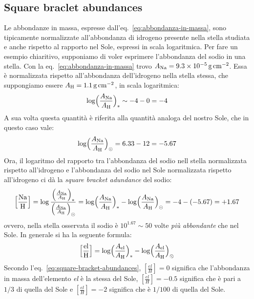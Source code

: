 \subsection{Square braclet abundances}
Le abbondanze in massa, espresse dall'eq.~\eqref{eq:abbondanza-in-massa}, sono tipicamente normalizzate all'abbondanza di idrogeno presente nella stella studiata e anche rispetto al rapporto nel Sole, espressi in scala logaritmica. Per fare un esempio chiaritivo, supponiamo di voler esprimere l'abbondanza del sodio in una stella. Con la eq.~\eqref{eq:abbondanza-in-massa} trovo $A_\textup{Na} = \SI{9.3e-5}{g.cm^{-2}}$. Essa è normalizzata rispetto all'abbondanza dell'idrogeno nella stella stessa, che suppongiamo essere $A_\textup{H} = \SI{1.1}{g.cm^{-2}}$, in scala logaritmica:
\[
\log \Bigl( \dfrac{A_\textup{Na}}{A_\textup{H}} \Bigr)_* \sim -4 -0 = -4    
\]
A sua volta questa quantità è riferita alla quantità analoga del nostro Sole, che in questo caso vale:
\[
    \log \Bigl( \dfrac{A_\textup{Na}}{A_\textup{H}} \Bigr)_\odot = 6.33 - 12 = -5.67
\]
Ora, il logaritmo del rapporto tra l'abbondanza del sodio nell stella normalizzata rispetto all'idrogeno e l'abbondanza del sodio nel Sole normalizzata rispetto all'idrogeno ci dà la \emph{square bracket adundance} del sodio:
\[
\Bigl[ \dfrac{\textup{Na}}{\textup{H}} \Bigr] = \log \dfrac{\Bigl(\frac{A_\textup{Na}}{A_\textup{H}}\Bigr)_*}{\Bigl(\frac{A_\textup{Na}}{A_\textup{H}}\Bigr)_\odot} = \log \Bigl( \dfrac{A_\textup{Na}}{A_\textup{H}} \Bigr)_* - \log \Bigl( \dfrac{A_\textup{Na}}{A_\textup{H}} \Bigr)_\odot = -4 -(-5.67) = +1.67
\]
ovvero, nella stella osservata il sodio è $10^{1.67} \sim 50$ volte \emph{più abbondante} che nel Sole. In generale si ha la seguente formula:
\begin{equation}\label{eq:square-bracket-abundances}
    \Bigl[ \dfrac{\textup{el}}{\textup{H}} \Bigr] = \log \Bigl( \dfrac{A_\textup{el}}{A_\textup{H}} \Bigr)_* - \log \Bigl( \dfrac{A_\textup{el}}{A_\textup{H}} \Bigr)_\odot
\end{equation}
Secondo l'eq.~\eqref{eq:square-bracket-abundances}, $[\frac{el}{H}] = 0$ significa che l'abbondanza in massa dell'elemento \emph{el} è la stessa del Sole, $[\frac{el}{H}] = -0.5$ significa che è pari a $1/3$ di quella del Sole e $[\frac{el}{H}] = -2$ significa che è $1/100$ di quella del Sole.